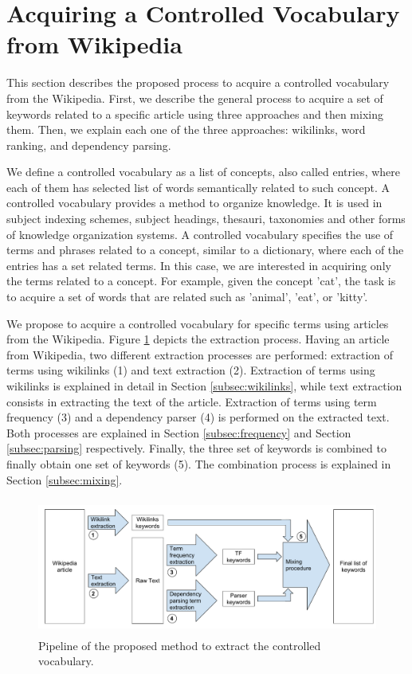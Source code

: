 \documentclass[oribibl]{llncs}
\begin{document}


\section{Acquiring a Controlled Vocabulary from Wikipedia}


This section describes the proposed process to acquire a controlled vocabulary from the Wikipedia. First, we describe the general process to acquire a set of keywords related to a specific article using three approaches and then mixing them. Then, we explain each one of the three approaches: wikilinks, word ranking, and dependency parsing. 

We define a controlled vocabulary as a list of concepts, also called entries, where each of them has selected list of words semantically related to such concept. A controlled vocabulary provides a method to organize knowledge. It is used in subject indexing schemes, subject headings, thesauri, taxonomies and other forms of knowledge organization systems. A controlled vocabulary specifies the use of terms and phrases related to a concept, similar to a dictionary, where each of the entries has a set related terms. In this case, we are interested in acquiring only the terms related to a concept. For example, given the concept 'cat', the task is to acquire a set of words that are related such as 'animal', 'eat', or 'kitty'. 

We propose to acquire a controlled vocabulary for specific terms using articles from the Wikipedia. Figure \ref{fig:extraction} depicts the extraction process. Having an article from Wikipedia, two different extraction processes are performed: extraction of terms using wikilinks (1) and text extraction (2). Extraction of terms using wikilinks is explained in detail in Section \ref{subsec:wikilinks}, while text extraction consists in extracting the text of the article. Extraction of terms using term frequency (3) and a dependency parser (4) is performed on the extracted text. Both processes are explained in Section \ref{subsec:frequency} and Section \ref{subsec:parsing} respectively. Finally, the three set of keywords is combined to finally obtain one set of keywords (5). The combination process is explained in Section \ref{subsec:mixing}.

\begin{figure}[t]
\centering
\includegraphics[height=4.5cm]{images/extraction}
\caption{Pipeline of the proposed method to extract the controlled vocabulary.}
\label{fig:extraction}
\end{figure}
\end{document}
